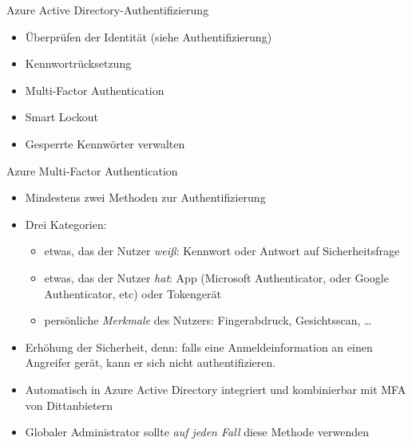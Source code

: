 \begin{flashcard}[\ ]{Azure Active Directory-Authentifizierung}
    \begin{itemize}
        \item Überprüfen der Identität
\newline(siehe Authentifizierung)
        \item Kennwortrücksetzung
        \item Multi-Factor Authentication
        \item Smart Lockout
        \item Gesperrte Kennwörter verwalten
    \end{itemize}
\end{flashcard}

\begin{flashcard}[Definition]{Azure Multi-Factor Authentication}
    \begin{itemize}
        \item Mindestens zwei Methoden zur Authentifizierung
        \item Drei Kategorien:
            \begin{itemize}
                \item etwas, das der Nutzer \emph{weiß}: Kennwort oder Antwort auf Sicherheitsfrage
                \item etwas, das der Nutzer \emph{hat}: App (Microsoft Authenticator, oder Google Authenticator, etc) oder Tokengerät
                \item persönliche \emph{Merkmale} des Nutzers: Fingerabdruck, Gesichtsscan, \ldots
        \end{itemize}
        \item Erhöhung der Sicherheit, denn: falls eine Anmeldeinformation an einen Angreifer gerät, kann er sich nicht authentifizieren.
        \item Automatisch in Azure Active Directory integriert und kombinierbar mit MFA von Dittanbietern
        \item Globaler Administrator sollte \emph{auf jeden Fall} diese Methode verwenden
    \end{itemize}
\end{flashcard}

